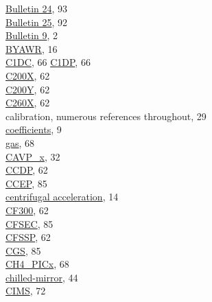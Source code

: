 \documentclass[
]{book}
\begin{document}
\href{./5-cloud-physics-variables.html\#plwc}{Bulletin 24}, 93\\
\href{./10-obsolete-variables.html\#swtc}{Bulletin 25}, 92\\
\href{./4-the-state-of-the-atmosphere.html\#humidity}{Bulletin 9}, 2\\
\href{./3-the-state-of-the-aircraft.html\#byawr}{BYAWR}, 16\\
\href{./5-cloud-physics-variables.html\#c1dc-c1dp}{C1DC}, 66
\href{./5-cloud-physics-variables.html\#c1dc-c1dp}{C1DP}, 66\\
\href{./5-cloud-physics-variables.html\#size-distribution}{C200X}, 62\\
\href{./5-cloud-physics-variables.html\#size-distribution}{C200Y}, 62\\
\href{./5-cloud-physics-variables.html\#size-distribution}{C260X}, 62\\
calibration, numerous references throughout, 29\\
\hspace*{0.333em}\hspace*{0.333em}\href{./1-general-information-about-data-files.html\#background-information}{coefficients}, 9\\
\hspace*{0.333em}\hspace*{0.333em}\href{./6-air-chemistry-measurements.html\#comr-al}{gas}, 68\\
\href{./4-the-state-of-the-atmosphere.html\#p-special}{CAVP\_x}, 32\\
\href{./5-cloud-physics-variables.html\#size-distribution}{CCDP}, 62\\
\href{./10-obsolete-variables.html\#loranc}{CCEP}, 85\\
\href{./3-the-state-of-the-aircraft.html\#wp3}{centrifugal acceleration}, 14\\
\href{./5-cloud-physics-variables.html\#size-distribution}{CF300}, 62\\
\href{./10-obsolete-variables.html\#loranc}{CFSEC}, 85\\
\href{./5-cloud-physics-variables.html\#size-distribution}{CFSSP}, 62\\
\href{./10-obsolete-variables.html\#loranc}{CGS}, 85\\
\href{./6-air-chemistry-measurements.html\#co2-pic}{CH4\_PICx}, 68\\
\href{./4-the-state-of-the-atmosphere.html\#dew-point}{chilled-mirror}, 44\\
\href{./6-air-chemistry-measurements.html\#awas-cims-qcls-toga}{CIMS}, 72\\
\end{document}
